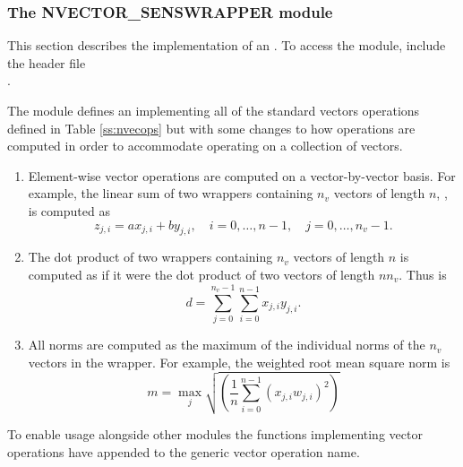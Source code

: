 \subsubsection*{The NVECTOR\_SENSWRAPPER module}
\label{ss:sunnonlinsol_senswrapper}

This section describes the {\nvecwrap} implementation of an {\nvector}. To
access the {\nvecwrap} module, include the header file \\ \noindent
{}.

The {\nvecwrap} module defines an  implementing all of the
standard vectors operations defined in Table \ref{ss:nvecops} but with some
changes to how operations are computed in order to accommodate operating on a
collection of vectors.
\begin{enumerate}

\item Element-wise vector operations are computed on a vector-by-vector basis. For
example, the linear sum of two wrappers containing $n_v$ vectors of length $n$,
, is computed as
\begin{equation*}
z_{j,i} = a x_{j,i} + b y_{j,i}, \quad i=0,\ldots,n-1, \quad j=0,\ldots,n_v-1.
\end{equation*}

\item The dot product of two wrappers containing $n_v$ vectors of length $n$ is
computed as if it were the dot product of two vectors of length $n n_v$.
Thus  is
\begin{equation*}
d = \sum_{j=0}^{n_v-1} \sum_{i=0}^{n-1} x_{j,i} y_{j,i}.
\end{equation*}

\item All norms are computed as the maximum of the individual norms of the $n_v$ vectors
in the wrapper. For example, the weighted root mean square norm
 is
\begin{equation*}
m = \max_{j} \sqrt{ \left( \frac1n \sum_{i=0}^{n-1} \left(x_{j,i}
w_{j,i}\right)^2\right) }
\end{equation*}

\end{enumerate}
To enable usage alongside other {\nvector} modules the {\nvecwrap} functions
implementing vector operations have  appended to the
generic vector operation name.

